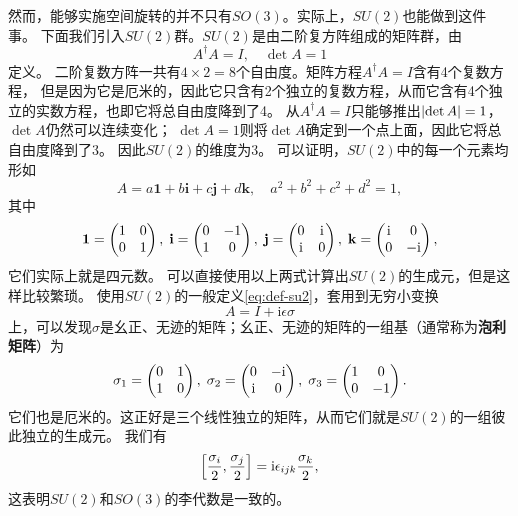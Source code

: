 \documentclass[hyperref, UTF8, a4paper]{ctexart}
\newcommand*{\ii}{\mathrm{i}}
\begin{document}
然而，能够实施空间旋转的并不只有$SO(3)$。实际上，$SU(2)$也能做到这件事。
下面我们引入$SU(2)$群。$SU(2)$是由二阶复方阵组成的矩阵群，由
\begin{equation}
    A^\dagger A = I, \quad \det A = 1
    \label{eq:def-su2}
\end{equation}
定义。
二阶复数方阵一共有$4 \times 2 = 8$个自由度。矩阵方程$A^\dagger A = I$含有4个复数方程，
但是因为它是厄米的，因此它只含有2个独立的复数方程，从而它含有4个独立的实数方程，也即它将总自由度降到了4。
从$A^\dagger A = I$只能够推出$\abs{\det A} = 1$，$\det A$仍然可以连续变化；
$\det A = 1$则将$\det A$确定到一个点上面，因此它将总自由度降到了3。
因此$SU(2)$的维度为3。
可以证明，$SU(2)$中的每一个元素均形如
\begin{equation}
    A = a \mathbf{1} + b \mathbf{i} + c \mathbf{j} + d \mathbf{k}, \quad a^2 + b^2 + c^2 + d^2 = 1,
    \label{eq:su2-expression}
\end{equation}
其中
\begin{equation}
    \mathbf{1} = \pmqty{1 & 0 \\ 0 & 1}, \; \mathbf{i} = \pmqty{0 & -1 \\ 1 & 0}, \; 
    \mathbf{j} = \pmqty{0 & \ii \\ \ii & 0}, \; \mathbf{k} = \pmqty{\ii & 0 \\ 0 & -\ii},
    \label{eq:quad-basis}
\end{equation}
它们实际上就是四元数。
可以直接使用以上两式计算出$SU(2)$的生成元，但是这样比较繁琐。
使用$SU(2)$的一般定义\eqref{eq:def-su2}，套用到无穷小变换
\[
    A = I + \ii \epsilon \sigma
\]
上，可以发现$\sigma$是幺正、无迹的矩阵；幺正、无迹的矩阵的一组基（通常称为\textbf{泡利矩阵}）为
\begin{equation}
    \sigma_1 = \pmqty{0 & 1 \\ 1 & 0}, \; \sigma_2 = \pmqty{0 & -\ii \\ \ii & 0}, \; \sigma_3 = \pmqty{1 & 0 \\ 0 & -1}.
    \label{eq:sigma-matrix}
\end{equation}
它们也是厄米的。这正好是三个线性独立的矩阵，从而它们就是$SU(2)$的一组彼此独立的生成元。
我们有
\begin{equation}
    \comm{\frac{\sigma_i}{2}}{\frac{\sigma_j}{2}} = \ii \epsilon_{ijk} \frac{\sigma_k}{2},
\end{equation}
这表明$SU(2)$和$SO(3)$的李代数是一致的。
\end{document}

